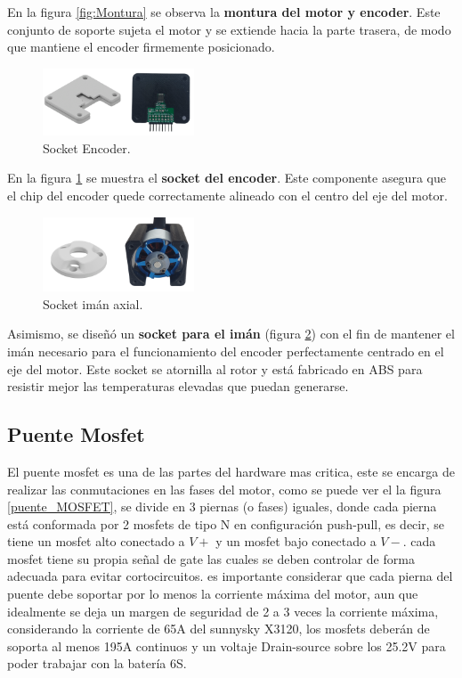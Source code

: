 \documentclass[11pt]{report}
\begin{document}
En la figura \ref{fig:Montura} se observa la \textbf{montura del motor y encoder}. Este conjunto de soporte sujeta el motor y se extiende hacia la parte trasera, de modo que mantiene el encoder firmemente posicionado.

\begin{figure}[ht]
	\centering
	\includegraphics[width=0.4\textwidth]{imagenes/Motor/encoder.png}
	\caption{Socket Encoder.}
	\label{fig:encoder}
\end{figure}
\FloatBarrier

En la figura \ref{fig:encoder} se muestra el \textbf{socket del encoder}. Este componente asegura que el chip del encoder quede correctamente alineado con el centro del eje del motor.

\begin{figure}[ht]
	\centering
	\includegraphics[width=0.4\textwidth]{imagenes/Motor/iman.png}
	\caption{Socket imán axial.}
	\label{fig:iman}
\end{figure}
\FloatBarrier

Asimismo, se diseñó un \textbf{socket para el imán} (figura \ref{fig:iman}) con el fin de mantener el imán necesario para el funcionamiento del encoder perfectamente centrado en el eje del motor. Este socket se atornilla al rotor y está fabricado en ABS para resistir mejor las temperaturas elevadas que puedan generarse.

\newpage
\subsection{Puente Mosfet}

El puente mosfet es una de las partes del hardware mas critica, este se encarga de realizar las conmutaciones en las fases del motor, como se puede ver el la figura \ref{puente_MOSFET}, se divide en 3 piernas (o fases) iguales, donde cada pierna está conformada por 2 mosfets de tipo N en configuración push-pull, es decir, se tiene un mosfet alto conectado a $V+$ y un mosfet bajo conectado a $V-$. cada mosfet tiene su propia señal de gate las cuales se deben controlar de forma adecuada para evitar cortocircuitos. es importante considerar que cada pierna del puente debe soportar por lo menos la corriente máxima del motor, aun que idealmente se deja un margen de seguridad de 2 a 3 veces la corriente máxima, considerando la corriente de 65A del sunnysky X3120, los mosfets deberán de soporta al menos 195A continuos y un voltaje Drain-source sobre los 25.2V para poder trabajar con la batería 6S.
\end{document}
